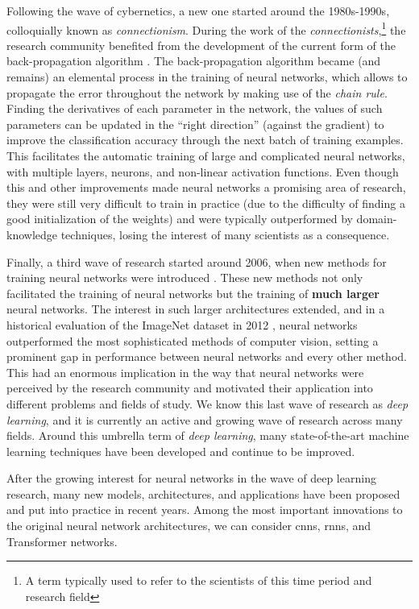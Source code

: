 Following the wave of cybernetics, a new one started around
the 1980s-1990s, colloquially known as \emph{connectionism}.
During the work of the \emph{connectionists},\footnote{A
term typically used to refer to the scientists of this time
period and research field} the research community benefited
from the development of the current form of the
back-propagation algorithm
\parencite{rumelhart1988learning}. The back-propagation
algorithm became (and remains) an elemental process in the
training of neural networks, which allows to propagate the
error throughout the network by making use of the
\emph{chain rule}. Finding the derivatives of each parameter
in the network, the values of such parameters can be updated
in the ``right direction'' (against the gradient) to improve
the classification accuracy through the next batch of
training examples. This facilitates the automatic training
of large and complicated neural networks, with multiple
layers, neurons, and non-linear activation functions. Even
though this and other improvements made neural networks a
promising area of research, they were still very difficult
to train in practice (due to the difficulty of finding a
good initialization of the weights) and were typically
outperformed by domain-knowledge techniques, losing the
interest of many scientists as a consequence.

Finally, a third wave of research started around 2006, when
new methods for training neural networks were introduced
\parencite{hinton2006fast}. These new methods not only
facilitated the training of neural networks but the training
of \textbf{much larger} neural networks. The interest in
such larger architectures extended, and in a historical
evaluation of the ImageNet dataset in 2012
\parencite{krizhevsky2012imagenet}, neural networks
outperformed the most sophisticated methods of computer
vision, setting a prominent gap in performance between
neural networks and every other method. This had an enormous
implication in the way that neural networks were perceived
by the research community and motivated their application
into different problems and fields of study. We know this
last wave of research as \emph{deep learning}, and it is
currently an active and growing wave of research across many
fields. Around this umbrella term of \emph{deep learning},
many state-of-the-art machine learning techniques have been
developed and continue to be improved.

 After the growing
interest for neural networks in the wave of deep learning
research, many new models, architectures, and applications
have been proposed and put into practice in recent years.
Among the most important innovations to the original neural
network architectures, we can consider \glspl{cnn},
\glspl{rnn}, and Transformer networks.

